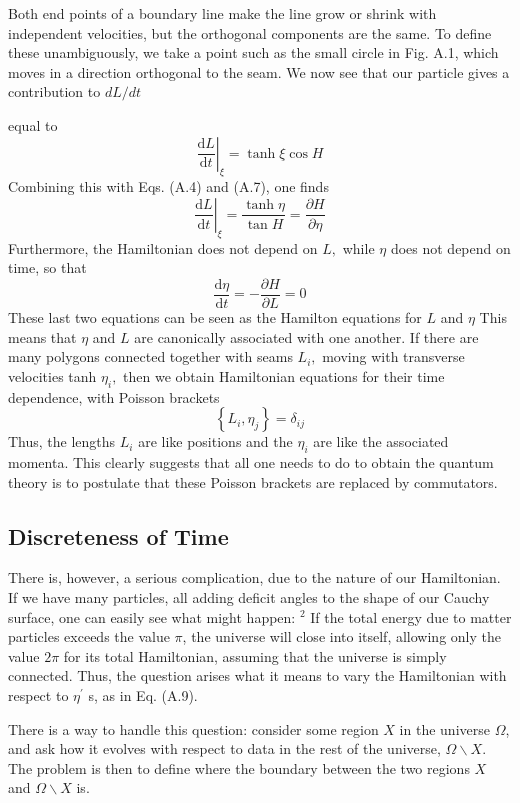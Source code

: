 \documentclass[main.tex]{subfiles}
\begin{document}
Both end points of a boundary line make the line grow or shrink with independent velocities, but the orthogonal components are the same. To define these unambiguously, we take a point such as the small circle in Fig. A.1, which moves in a direction orthogonal to the seam. We now see that our particle gives a contribution to $dL/dt$ 

equal to
$$
\left.\frac{\mathrm{d} L}{\mathrm{d} t}\right|_{\xi}=\tanh \xi \cos H
$$
Combining this with Eqs. (A.4) and (A.7), one finds
$$
\left.\frac{\mathrm{d} L}{\mathrm{d} t}\right|_{\xi}=\frac{\tanh \eta}{\tan H}=\frac{\partial H}{\partial \eta}
$$
Furthermore, the Hamiltonian does not depend on $L,$ while $\eta$ does not depend on time, so that
$$
\frac{\mathrm{d} \eta}{\mathrm{d} t}=-\frac{\partial H}{\partial L}=0
$$
These last two equations can be seen as the Hamilton equations for $L$ and $\eta$ This means that $\eta$ and $L$ are canonically associated with one another. If there are many polygons connected together with seams $L_{i},$ moving with transverse velocities tanh $\eta_{i},$ then we obtain Hamiltonian equations for their time dependence, with Poisson brackets
$$
\left\{L_{i}, \eta_{j}\right\}=\delta_{i j}
$$
Thus, the lengths $L_{i}$ are like positions and the $\eta_{i}$ are like the associated momenta. This clearly suggests that all one needs to do to obtain the quantum theory is to postulate that these Poisson brackets are replaced by commutators.

\subsection{Discreteness of Time}

There is, however, a serious complication, due to the nature of our Hamiltonian. If we have many particles, all adding deficit angles to the shape of our Cauchy surface, one can easily see what might happen: $^{2}$
If the total energy due to matter particles exceeds the value $\pi$, the universe will close into itself, allowing only the value $2 \pi$ for its total Hamiltonian,
assuming that the universe is simply connected. Thus, the question arises what it means to vary the Hamiltonian with respect to $\eta^{\prime}$ s, as in Eq. (A.9).

There is a way to handle this question: consider some region $X$ in the universe $\Omega$, and ask how it evolves with respect to data in the rest of the universe, $\Omega \backslash X .$ The problem is then to define where the boundary between the two regions $X$ and $\Omega \backslash X$ is.
\end{document}
